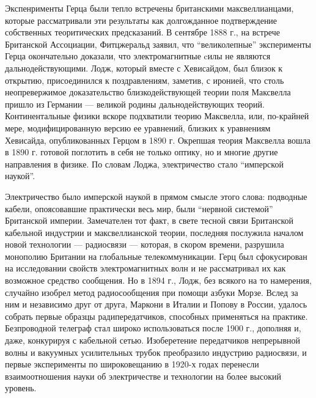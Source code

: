 \documentclass[12pt, oneside, a4paper]{article}
\begin{document}
Экспенрименты Герца были тепло встречены британскими максвеллианцами, которые рассматривали эти результаты как долгожданное подтверждение собственных теоритических предсказаний. В сентябре 1888 г., на встрече Британской Ассоциации, Фитцжеральд заявил, что ``великолепные'' эксперименты Герца окончательно доказали, что электромагнитные cилы не являются дальнодействующими. Лодж, который вместе с Хевисайдом, был близок к открытию, присоединился к поздравлениям, заметив, с иронией, что столь неопревержимое доказательство близкодействующей теории поля Максвелла пришло из Германии --- великой родины дальнодействующих теорий. Континентальные физики вскоре подхватили теорию Максвелла, или, по-крайней мере, модифицированную версию ее уравнений, близких к уравнениям Хевисайда, опубликованных Герцом в 1890 г. Окрепшая теория Максвелла вошла в 1890 г. готовой поглотить в себя не только оптику, но и многие другие направления в физике. По словам Лоджа, электричество стало ``имперской наукой''.

Электричество было имперской наукой в прямом смысле этого слова: подводные кабели, опоясовавшие практически весь мир, были ``нервной системой'' Британской империи. Замечателен тот факт, в свете тесной связи Британской кабельной индустрии и максвеллианской теории, последняя послужила началом новой технологии --- радиосвязи --- которая, в скором времени, разрушила монополию Британии на глобальные телекоммуникации. Герц был сфокусирован на исследовании свойств электромагнитных волн и не рассматривал их как возможное средство сообщения.  Но в 1894 г., Лодж, без всякого на то намерения, случайно изобрел метод радиосообщения при помощи азбуки Морзе. Вслед за ним и независимо друг от друга, Маркони в Италии и Попову в России, удалось собрать первые образцы радипередатчиков, способных применяться на практике. Безпроводной телеграф стал широко использоваться после 1900 г., дополняя и, даже, конкурируя с кабельной сетью. Изоберетение передатчиков непрерывной волны и вакуумных усилительных трубок преобразило индустрию радиосвязи, и первые эксперименты по широковещанию в 1920-х годах перенесли взаимоотношения науки об электричестве и технологии на более высокий уровень.
\end{document}
